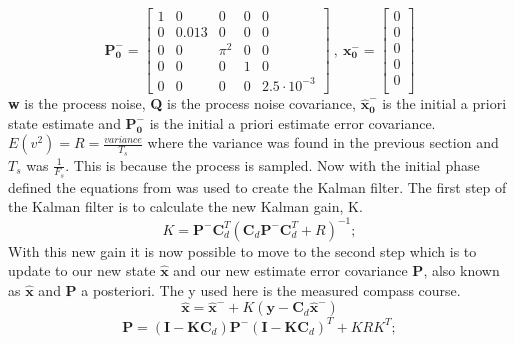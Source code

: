 \begin{equation}
    \boldsymbol{P_0^-} = \begin{bmatrix}
        1 & 0 & 0 & 0 & 0 \\
        0 & 0.013 & 0 & 0 & 0 \\
        0 & 0 & \pi^2 & 0 & 0 \\
        0 & 0 & 0 & 1 & 0 \\
        0 & 0 & 0 & 0 & 2.5 \cdot 10^{-3} 
    \end{bmatrix} \ , \ \boldsymbol{x_0^-} = \begin{bmatrix}
        0 \\ 0 \\ 0 \\ 0 \\ 0 \\
    \end{bmatrix}
\end{equation}
\textbf{w} is the process noise, \textbf{Q} is the process noise covariance, $\boldsymbol{\hat{x}_0^-}$ is the initial a priori state estimate and $\boldsymbol{P_0^-}$ is the initial a priori estimate error covariance. $E(v^2) = R = \frac{variance}{T_{s}}$ where the variance was found in the previous section and $T_{s}$ was $\frac{1}{F_s}$. This is because the process is sampled.
\newline\newline
Now with the initial phase defined the equations from \cite{chen14} was used to create the Kalman filter. The first step of the Kalman filter is to calculate the new Kalman gain, K.
\begin{equation}
    K = \boldsymbol{P^-}\boldsymbol{C}_d^T(\boldsymbol{C}_d\boldsymbol{P^-}\boldsymbol{C}_d^T+R)^{-1};
\end{equation}
With this new gain it is now possible to move to the second step which is to update to our new state $\boldsymbol{\hat{x}}$ and our new estimate error covariance $\boldsymbol{P}$, also known as  $\boldsymbol{\hat{x}}$ and $\boldsymbol{P}$ a posteriori. The y used here is the measured compass course.
\begin{equation}
    \boldsymbol{\hat{x}} = \boldsymbol{\hat{x}^-} + K(\boldsymbol{y}-\boldsymbol{C}_d\boldsymbol{\hat{x}^-})
\end{equation}
\begin{equation}
    \boldsymbol{P} = (\boldsymbol{I}-\boldsymbol{K}\boldsymbol{C}_d)\boldsymbol{P^-}(\boldsymbol{I}-\boldsymbol{K}\boldsymbol{C}_d)^T+KRK^T;
\end{equation}

